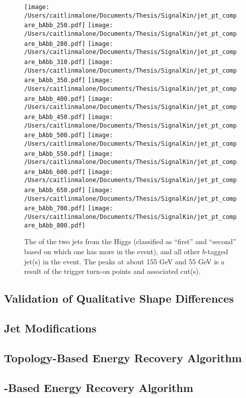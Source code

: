 \begin{figure}
    \texttt{[image: /Users/caitlinmalone/Documents/Thesis/SignalKin/jet\_pt\_compare\_bAbb\_250.pdf]}
    \texttt{[image: /Users/caitlinmalone/Documents/Thesis/SignalKin/jet\_pt\_compare\_bAbb\_280.pdf]}
    \texttt{[image: /Users/caitlinmalone/Documents/Thesis/SignalKin/jet\_pt\_compare\_bAbb\_310.pdf]}
    \texttt{[image: /Users/caitlinmalone/Documents/Thesis/SignalKin/jet\_pt\_compare\_bAbb\_350.pdf]}
    \texttt{[image: /Users/caitlinmalone/Documents/Thesis/SignalKin/jet\_pt\_compare\_bAbb\_400.pdf]}
    \texttt{[image: /Users/caitlinmalone/Documents/Thesis/SignalKin/jet\_pt\_compare\_bAbb\_450.pdf]}
    \texttt{[image: /Users/caitlinmalone/Documents/Thesis/SignalKin/jet\_pt\_compare\_bAbb\_500.pdf]}
    \texttt{[image: /Users/caitlinmalone/Documents/Thesis/SignalKin/jet\_pt\_compare\_bAbb\_550.pdf]}
    \texttt{[image: /Users/caitlinmalone/Documents/Thesis/SignalKin/jet\_pt\_compare\_bAbb\_600.pdf]}
    \texttt{[image: /Users/caitlinmalone/Documents/Thesis/SignalKin/jet\_pt\_compare\_bAbb\_650.pdf]}
    \texttt{[image: /Users/caitlinmalone/Documents/Thesis/SignalKin/jet\_pt\_compare\_bAbb\_700.pdf]}
    \texttt{[image: /Users/caitlinmalone/Documents/Thesis/SignalKin/jet\_pt\_compare\_bAbb\_800.pdf]}
    \label{fig:pt_higgs_and_associated_jets}
    \caption{The \pt of the two jets from the Higgs (classified as ``first'' and ``second'' based
    on which one has more \pt in the event), and all other $b$-tagged jet(s) in the event.
    The peaks at about 155 GeV and 55 GeV is a result of the trigger turn-on points and
    associated cut(s).  }
\end{figure}





\subsection{Validation of Qualitative Shape Differences}
\subsection{Jet Modifications}
\subsection{Topology-Based Energy Recovery Algorithm}
\subsection{\pt-Based Energy Recovery Algorithm}
 

